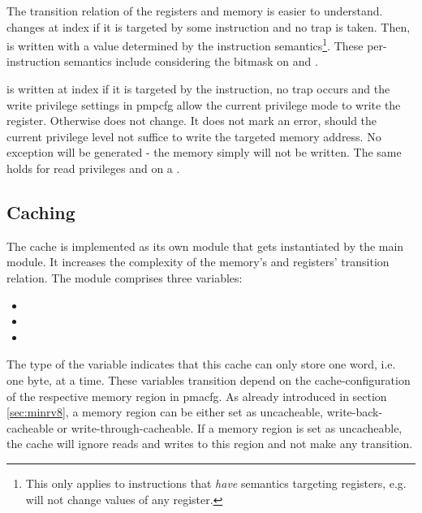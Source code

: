 The transition relation of the registers and memory is easier to understand.
 changes at index  if it is targeted by some instruction and no trap is taken.
Then,  is written with a value determined by the instruction semantics\footnote{%
    This only applies to instructions that \textit{have} semantics targeting registers, e.g.  will not change values of any register.
}.
These per-instruction semantics include considering the  bitmask on  and .

 is written at index  if it is targeted by the  instruction, no trap occurs and the write privilege settings in \gls{pmpcfg} allow the current privilege mode to write the register.
Otherwise  does not change.
It does not mark an error, should the current privilege level not suffice to write the targeted memory address.
No exception will be generated - the memory simply will not be written.
The same holds for read privileges and  on a .

\subsection{Caching}
\label{sec:implementation-caching}

The cache is implemented as its own module that gets instantiated by the main module.
It increases the complexity of the memory's and registers' transition relation.
The module comprises three variables:
\begin{itemize}
    \item {}
    \item {}
    \item {}
\end{itemize}

The type of the  variable indicates that this cache can only store one word, i.e. one byte, at a time.
These variables transition depend on the cache-configuration of the respective memory region in \gls{pmacfg}.
As already introduced in section \ref{sec:minrv8}, a memory region can be either set as uncacheable, write-back-cacheable or write-through-cacheable.
If a memory region is set as uncacheable, the cache will ignore reads and writes to this region and not make any transition.

